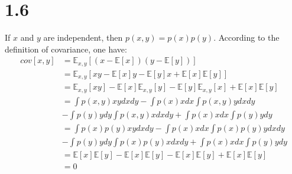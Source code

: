 \documentclass[10pt,a4paper,draft]{book}
\begin{document}
\section*{1.6}
If $x$ and $y$ are independent, then $p(x,y) = p(x)p(y)$. According to the definition of covariance, one have:
\begin{equation}
\begin{aligned}
cov[x,y] &= \mathbb{E}_{x,y}[(x-\mathbb{E}[x])(y-\mathbb{E}[y])] \\
&= \mathbb{E}_{x,y}[xy - \mathbb{E}[x]y - \mathbb{E}[y]x + \mathbb{E}[x]\mathbb{E}[y]] \\
&= \mathbb{E}_{x,y}[xy] - \mathbb{E}[x]\mathbb{E}_{x,y}[y] - \mathbb{E}[y]\mathbb{E}_{x,y}[x] + \mathbb{E}[x]\mathbb{E}[y] \\
&= \int p(x,y)xydxdy - \int p(x)xdx \int p(x,y)ydxdy \\ &- \int p(y)ydy \int p(x,y)xdxdy + \int p(x)xdx \int p(y)ydy \\
&= \int p(x)p(y)xydxdy - \int p(x)xdx \int p(x)p(y)ydxdy \\ &- \int p(y)ydy \int p(x)p(y)xdxdy + \int p(x)xdx \int p(y)ydy \\
&= \mathbb{E}[x]\mathbb{E}[y] - \mathbb{E}[x]\mathbb{E}[y] -\mathbb{E}[x]\mathbb{E}[y] + \mathbb{E}[x]\mathbb{E}[y] \\
&= 0
\end{aligned}
\end{equation}
\end{document}
